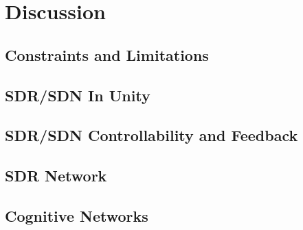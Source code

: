 
\chapter{Discussion} %

\label{Chapter5} %




\section{Constraints and Limitations}


\section{SDR/SDN In Unity}


\section{SDR/SDN Controllability and Feedback}


\section{SDR Network}


\section{Cognitive Networks}

